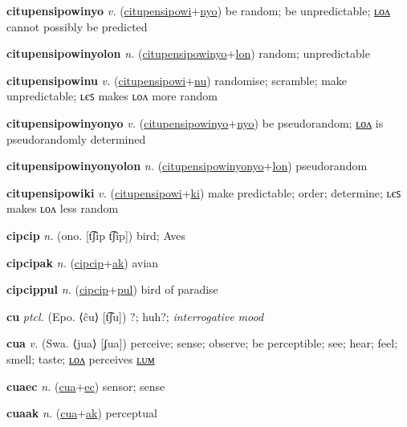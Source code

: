 \textbf{\hypertarget{citupensipowinyo}{citupensipowinyo}} \textit{v.} (\hyperlink{citupensipowi}{citupensipowi}+\allowbreak \hyperlink{nyo}{nyo})
be random; be unpredictable; \hyperlink{citupensipowinyolon}{ʟᴏᴧ} cannot possibly be predicted

\textbf{\hypertarget{citupensipowinyolon}{citupensipowinyolon}} \textit{n.} (\hyperlink{citupensipowinyo}{citupensipowinyo}+\allowbreak \hyperlink{lon}{lon})
random; unpredictable

\textbf{\hypertarget{citupensipowinu}{citupensipowinu}} \textit{v.} (\hyperlink{citupensipowi}{citupensipowi}+\allowbreak \hyperlink{nu}{nu})
randomise; scramble; make unpredictable; ʟєꜱ makes ʟᴏᴧ more random

\textbf{\hypertarget{citupensipowinyonyo}{citupensipowinyonyo}} \textit{v.} (\hyperlink{citupensipowinyo}{citupensipowinyo}+\allowbreak \hyperlink{nyo}{nyo})
be pseudorandom; \hyperlink{citupensipowinyonyolon}{ʟᴏᴧ} is pseudorandomly determined

\textbf{\hypertarget{citupensipowinyonyolon}{citupensipowinyonyolon}} \textit{n.} (\hyperlink{citupensipowinyonyo}{citupensipowinyonyo}+\allowbreak \hyperlink{lon}{lon})
pseudorandom

\textbf{\hypertarget{citupensipowiki}{citupensipowiki}} \textit{v.} (\hyperlink{citupensipowi}{citupensipowi}+\allowbreak \hyperlink{ki}{ki})
make predictable; order; determine; ʟєꜱ makes ʟᴏᴧ less random

\textbf{\hypertarget{cipcip}{cipcip}} \textit{n.} (ono. [t͡ʃip t͡ʃip])
bird; Aves

\textbf{\hypertarget{cipcipak}{cipcipak}} \textit{n.} (\hyperlink{cipcip}{cipcip}+\allowbreak \hyperlink{ak}{ak})
avian

\textbf{\hypertarget{cipcippul}{cipcippul}} \textit{n.} (\hyperlink{cipcip}{cipcip}+\allowbreak \hyperlink{pul}{pul})
bird of paradise

\textbf{\hypertarget{cu}{cu}} \textit{ptcl.} (Epo. ⟨ĉu⟩ [t͡ʃu])
?; huh?; \textit{interrogative mood}

\textbf{\hypertarget{cua}{cua}} \textit{v.} (Swa. ⟨jua⟩ [ʄua])
perceive; sense; observe; be perceptible; see; hear; feel; smell; taste; \hyperlink{cualon}{ʟᴏᴧ} perceives \hyperlink{cualum}{ʟᴜᴍ}

\textbf{\hypertarget{cuaec}{cuaec}} \textit{n.} (\hyperlink{cua}{cua}+\allowbreak \hyperlink{ec}{ec})
sensor; sense

\textbf{\hypertarget{cuaak}{cuaak}} \textit{n.} (\hyperlink{cua}{cua}+\allowbreak \hyperlink{ak}{ak})
perceptual

